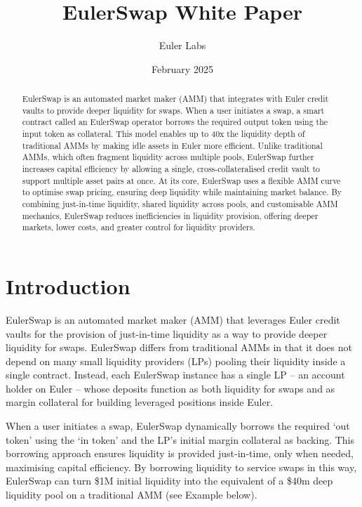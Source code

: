 \documentclass{article}
\title{EulerSwap White Paper}
\author{Euler Labs}
\date{February 2025}
\begin{document}
\maketitle

\begin{abstract}    
EulerSwap is an automated market maker (AMM) that integrates with Euler credit vaults to provide deeper liquidity for swaps. When a user initiates a swap, a smart contract called an EulerSwap operator borrows the required output token using the input token as collateral. This model enables up to 40x the liquidity depth of traditional AMMs by making idle assets in Euler more efficient. Unlike traditional AMMs, which often fragment liquidity across multiple pools, EulerSwap further increases capital efficiency by allowing a single, cross-collateralised credit vault to support multiple asset pairs at once. At its core, EulerSwap uses a flexible AMM curve to optimise swap pricing, ensuring deep liquidity while maintaining market balance. By combining just-in-time liquidity, shared liquidity across pools, and customisable AMM mechanics, EulerSwap reduces inefficiencies in liquidity provision, offering deeper markets, lower costs, and greater control for liquidity providers.
\end{abstract}

\section{Introduction}

EulerSwap is an automated market maker (AMM) that leverages Euler credit vaults for the provision of just-in-time liquidity as a way to provide deeper liquidity for swaps. EulerSwap differs from traditional AMMs in that it does not depend on many small liquidity providers (LPs) pooling their liquidity inside a single contract. Instead, each EulerSwap instance has a single LP -- an account holder on Euler -- whose deposits function as both liquidity for swaps and as margin collateral for building leveraged positions inside Euler. 

When a user initiates a swap, EulerSwap dynamically borrows the required `out token' using the `in token' and the LP's initial margin collateral as backing. This borrowing approach ensures liquidity is provided just-in-time, only when needed, maximising capital efficiency. By borrowing liquidity to service swaps in this way, EulerSwap can turn \$1M initial liquidity into the equivalent of a \$40m deep liquidity pool on a traditional AMM (see Example below).
\end{document}

